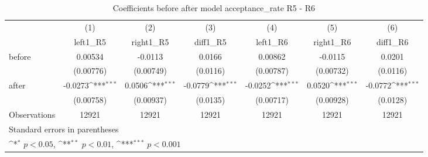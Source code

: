 \begin{table}[!ht]\centering \footnotesize
\def\sym#1{\ifmmode^{#1}\else\(^{#1}\)\fi}
\caption{Coefficients before after model acceptance\_rate R5 - R6}
\begin{tabular}{l*{6}{c}}
\hline\hline
                    &\multicolumn{1}{c}{(1)}&\multicolumn{1}{c}{(2)}&\multicolumn{1}{c}{(3)}&\multicolumn{1}{c}{(4)}&\multicolumn{1}{c}{(5)}&\multicolumn{1}{c}{(6)}\\
                    &\multicolumn{1}{c}{left1\_R5}&\multicolumn{1}{c}{right1\_R5}&\multicolumn{1}{c}{diff1\_R5}&\multicolumn{1}{c}{left1\_R6}&\multicolumn{1}{c}{right1\_R6}&\multicolumn{1}{c}{diff1\_R6}\\
\hline
before              &     0.00534         &     -0.0113         &      0.0166         &     0.00862         &     -0.0115         &      0.0201         \\
                    &   (0.00776)         &   (0.00749)         &    (0.0116)         &   (0.00787)         &   (0.00732)         &    (0.0116)         \\
[1em]
after               &     -0.0273\sym{***}&      0.0506\sym{***}&     -0.0779\sym{***}&     -0.0252\sym{***}&      0.0520\sym{***}&     -0.0772\sym{***}\\
                    &   (0.00758)         &   (0.00937)         &    (0.0135)         &   (0.00717)         &   (0.00928)         &    (0.0128)         \\
\hline
Observations        &       12921         &       12921         &       12921         &       12921         &       12921         &       12921         \\
\hline\hline
\multicolumn{7}{l}{\footnotesize Standard errors in parentheses}\\
\multicolumn{7}{l}{\footnotesize \sym{*} \(p<0.05\), \sym{**} \(p<0.01\), \sym{***} \(p<0.001\)}\\
\end{tabular}
\end{table}
